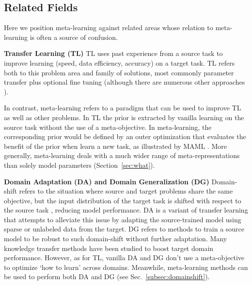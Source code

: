 \documentclass[10pt,journal,compsoc]{IEEEtran}
\newcommand{\keypoint}[1]{\vspace{0.1cm}\noindent\textbf{#1}\quad}
\begin{document}
\subsection{Related Fields}
Here we position meta-learning against related areas whose relation to meta-learning is often a source of confusion.

\keypoint{Transfer Learning (TL)} TL \cite{pan2009transfer_survey,pratt1991direct} 
uses past experience from a source task to improve learning (speed, data efficiency, accuracy) on a target task. TL refers both to this problem area and family of solutions, most commonly parameter transfer plus optional fine tuning \cite{yosinski2014howtransferable} (although there are numerous other approaches \cite{pan2009transfer_survey}).

In contrast, meta-learning refers to a paradigm that can be used to improve TL as well as other problems. In TL the prior is extracted by vanilla learning on the source task without the use of a meta-objective. In meta-learning, the corresponding prior would be defined by an outer optimization that evaluates the benefit of the prior when learn a new task, as illustrated by MAML \cite{finn2017maml}. More generally, meta-learning deals with a much wider range of meta-representations than solely model parameters (Section~\ref{sec:what}).





\keypoint{Domain Adaptation (DA) and Domain Generalization (DG)}
Domain-shift refers to the situation where source and target problems share the same objective, but the input distribution of the target task is shifted with respect to the source task \cite{csurka2017domainadaptationbook,pan2009transfer_survey}, reducing model performance. DA is a variant of transfer learning that attempts to alleviate this issue by adapting the source-trained model using sparse or unlabeled data from the target. DG refers to methods to train a source model to be robust to such domain-shift without further adaptation. Many knowledge transfer methods have been studied \cite{csurka2017domainadaptationbook,pan2009transfer_survey} to boost target domain performance. However, as for TL, vanilla DA and DG don't use a meta-objective to optimize `how to learn' across domains. Meanwhile, meta-learning methods can be used to perform both DA \cite{li2020metadomain} and DG \cite{li2019featurecritic} (see Sec.~\ref{subsec:domainshift}).
\end{document}
